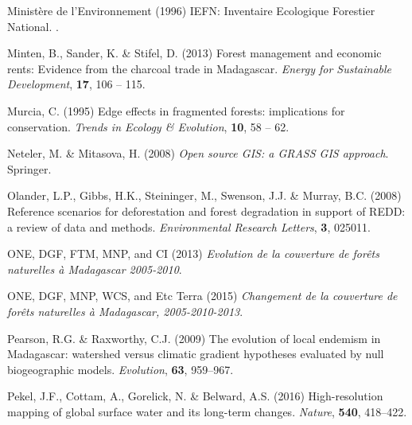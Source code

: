 \documentclass[a4paper, 12pt, leqno]{article} %
\begin{document}
\begin{thebibliography}{55}
{Ministère de l'Environnement} (1996) {IEFN: Inventaire Ecologique Forestier
  National}.
.

Minten, B., Sander, K. \& Stifel, D. (2013) {Forest management and economic
  rents: Evidence from the charcoal trade in Madagascar}.
\newblock \emph{Energy for Sustainable Development}, \textbf{17}, 106 -- 115.

Murcia, C. (1995) Edge effects in fragmented forests: implications for
  conservation.
\newblock \emph{Trends in Ecology \& Evolution}, \textbf{10}, 58 -- 62.

Neteler, M. \& Mitasova, H. (2008) \emph{{Open source GIS: a GRASS GIS
  approach}}.
\newblock Springer.

Olander, L.P., Gibbs, H.K., Steininger, M., Swenson, J.J. \& Murray, B.C.
  (2008) {Reference scenarios for deforestation and forest degradation in
  support of REDD: a review of data and methods}.
\newblock \emph{Environmental Research Letters}, \textbf{3}, 025011.

{ONE, DGF, FTM, MNP, and CI} (2013) \emph{{Evolution de la couverture de
  forêts naturelles à Madagascar 2005-2010}}.

{ONE, DGF, MNP, WCS, and Etc Terra} (2015) \emph{{Changement de la couverture
  de forêts naturelles à Madagascar, 2005-2010-2013}}.

Pearson, R.G. \& Raxworthy, C.J. (2009) {The evolution of local endemism in
  Madagascar: watershed versus climatic gradient hypotheses evaluated by null
  biogeographic models}.
\newblock \emph{Evolution}, \textbf{63}, 959--967.

Pekel, J.F., Cottam, A., Gorelick, N. \& Belward, A.S. (2016) {High-resolution
  mapping of global surface water and its long-term changes}.
\newblock \emph{Nature}, \textbf{540}, 418--422.


\end{thebibliography}
\end{document}
